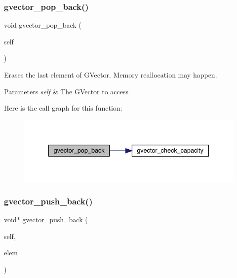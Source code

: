 \subsubsection{\texorpdfstring{gvector\+\_\+pop\+\_\+back()}{gvector\_pop\_back()}}
{\footnotesize\ttfamily void gvector\+\_\+pop\+\_\+back (\begin{DoxyParamCaption}\item[{\hyperlink{group___g_vector_ga6d90d5e6b721779a43354f2752b79281}{G\+Vector} $\ast$}]{self }\end{DoxyParamCaption})}



Erases the last element of G\+Vector. Memory reallocation may happen. 


\begin{DoxyParams}{Parameters}
{\em self} & The G\+Vector to access \\
\hline
\end{DoxyParams}
Here is the call graph for this function\+:\nopagebreak
\begin{figure}[H]
\begin{center}
\leavevmode
\includegraphics[width=336pt]{group___g_vector_ga6fd765130f11b97b8fcca59d7c4e98d1_cgraph}
\end{center}
\end{figure}
\hypertarget{group___g_vector_ga638f666cc999e6b840302ca1de552b85}{}\label{group___g_vector_ga638f666cc999e6b840302ca1de552b85} 
\subsubsection{\texorpdfstring{gvector\+\_\+push\+\_\+back()}{gvector\_push\_back()}}
{\footnotesize\ttfamily void$\ast$ gvector\+\_\+push\+\_\+back (\begin{DoxyParamCaption}\item[{\hyperlink{group___g_vector_ga6d90d5e6b721779a43354f2752b79281}{G\+Vector} $\ast$}]{self,  }\item[{void $\ast$}]{elem }\end{DoxyParamCaption})}



